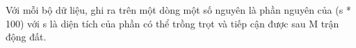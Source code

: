 Với mỗi bộ dữ liệu, ghi ra trên một dòng một số nguyên là phần nguyên của (s * 100) với s là diện tích của phần có thể trồng trọt và tiếp cận được sau M trận động đất.